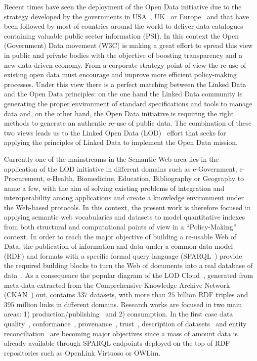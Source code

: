 Recent times have seen the deployment of the Open Data initiative due to the strategy 
developed by the governments in USA~\cite{usa}, UK~\cite{uk2012} or Europe~\cite{d2003-update,policy-eu} and that have been followed by most of countries around the world to deliver data 
catalogues containing valuable public sector information (PSI). In this context the Open (Government) Data movement (W3C) is making a great effort 
to spread this view in public and private bodies with the objective of boosting transparency and a new data-driven economy. 
From a corporate strategy point of view the re-use of existing open data must encourage and improve 
more efficient policy-making processes. Under this view there is a perfect matching between the Linked Data and the Open Data 
principles: on the one hand the Linked Data community is generating the proper environment of standard 
specifications and tools to manage data and, on the other hand, the Open Data initiative is requiring 
the right methods to generate an authentic re-use of public data. The combination of these 
two views leads us to the Linked Open Data (LOD)~\cite{Berners-Lee-2006,Heath_Bizer_2011,Bauer2012} effort that seeks for applying the principles of 
Linked Data to implement the Open Data mission.

Currently one of the mainstreams in the Semantic Web area lies in the application of the LOD initiative in 
different domains such as  e-Government, e-Procurement, e-Health, Biomedicine, Education, Bibliography or Geography to name a few,  
with the aim of solving existing problems of integration and interoperability among applications and create a 
knowledge environment under the Web-based protocols. In this context, the present work is therefore focused 
in applying semantic web vocabularies and datasets to model quantitative indexes from both structural 
and computational points of view in a ``Policy-Making'' context. In order to reach the major objective of building a re-usable Web of Data,  
the publication of information and data under a common data model (RDF) and formats with 
a specific formal query language (SPARQL~\cite{Sparql11}) provide the required building blocks to turn 
the Web of documents into a real database of data~\cite{freebase}. As a consequence the popular 
diagram of the LOD Cloud~\cite{linked-data-cloud}, generated from meta-data extracted from the Comprehensive Knowledge Archive Network (CKAN~\cite{ckan}) out, 
contains $337$ datasets, with more than $25$ billion RDF triples and $395$ million links in different  domains. 
Research works are focused in two main areas: 1) production/publishing~\cite{bizer07how} and 2) consumption. 
In the first case data quality~\cite{wiqa,ld-quality,lodq}, conformance~\cite{HoganUHCPD:2012:237}, 
provenance~\cite{w3c-prov}, trust~\cite{Carroll05namedgraphs}, description of datasets~\cite{void} and 
entity reconciliation~\cite{Maali_Cyganiak_2011} are becoming major objectives since a mass of amount data is already available 
through SPARQL endpoints deployed on the top of RDF repositories such as OpenLink Virtuoso or OWLim. 

